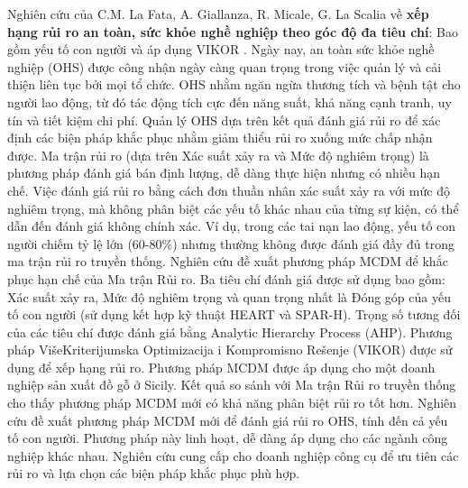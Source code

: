 Nghiên cứu của C.M. La Fata, A. Giallanza, R. Micale, G. La Scalia về \textbf{xếp hạng rủi ro an toàn, sức khỏe nghề nghiệp theo góc độ đa tiêu chí}: Bao gồm yếu tố con người và áp dụng VIKOR \cite{sciencedirect3}. Ngày nay, an toàn sức khỏe nghề nghiệp (OHS) được công nhận ngày càng quan trọng trong việc quản lý và cải thiện liên tục bởi mọi tổ chức. OHS nhằm ngăn ngừa thương tích và bệnh tật cho người lao động, từ đó tác động tích cực đến năng suất, khả năng cạnh tranh, uy tín và tiết kiệm chi phí.  Quản lý OHS dựa trên kết quả đánh giá rủi ro để xác định các biện pháp khắc phục nhằm giảm thiểu rủi ro xuống mức chấp nhận được. Ma trận rủi ro (dựa trên Xác suất xảy ra và Mức độ nghiêm trọng) là phương pháp đánh giá bán định lượng, dễ dàng thực hiện nhưng có nhiều hạn chế. Việc đánh giá rủi ro bằng cách đơn thuần nhân xác suất xảy ra với mức độ nghiêm trọng, mà không phân biệt các yếu tố khác nhau của từng sự kiện, có thể dẫn đến đánh giá không chính xác. Ví dụ, trong các tai nạn lao động, yếu tố con người chiếm tỷ lệ lớn (60-80\%) nhưng thường không được đánh giá đầy đủ trong ma trận rủi ro truyền thống. Nghiên cứu đề xuất phương pháp MCDM để khắc phục hạn chế của Ma trận Rủi ro. Ba tiêu chí đánh giá được sử dụng bao gồm: Xác suất xảy ra, Mức độ nghiêm trọng và quan trọng nhất là Đóng góp của yếu tố con người (sử dụng kết hợp kỹ thuật HEART và SPAR-H). Trọng số tương đối của các tiêu chí được đánh giá bằng Analytic Hierarchy Process (AHP). Phương pháp VišeKriterijumska Optimizacija i Kompromisno Rešenje (VIKOR) được sử dụng để xếp hạng rủi ro. Phương pháp MCDM được áp dụng cho một doanh nghiệp sản xuất đồ gỗ ở Sicily. Kết quả so sánh với Ma trận Rủi ro truyền thống cho thấy phương pháp MCDM mới có khả năng phân biệt rủi ro tốt hơn. Nghiên cứu đề xuất phương pháp MCDM mới để đánh giá rủi ro OHS, tính đến cả yếu tố con người. Phương pháp này linh hoạt, dễ dàng áp dụng cho các ngành công nghiệp khác nhau. Nghiên cứu cung cấp cho doanh nghiệp công cụ để ưu tiên các rủi ro và lựa chọn các biện pháp khắc phục phù hợp.

